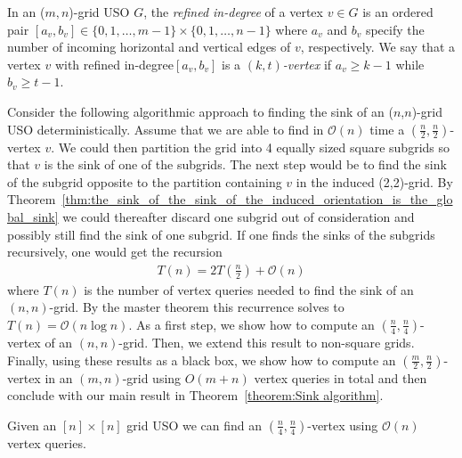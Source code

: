 \documentclass[runningheads,a4paper]{llncs}
\newcommand{\JN}[1]{\marginpar{\parbox{4cm}{{\small {\bf JN:} #1}}}} %
\newcommand{\indegree}{refined in-degree\xspace}
\begin{document}

In an ($m,n$)-grid USO $G$, the \emph{\indegree} of a vertex $v \in G$ is an ordered pair $[a_v, b_v] \in \{0,1,\ldots,m-1\}\times \{0,1,\ldots,n-1\}$ where $a_v$ and $b_v$ specify the number of incoming horizontal  and vertical edges of $v$, respectively.
We say that a vertex $v$ with \indegree $[a_v, b_v]$ is a \emph{$(k, t)$-vertex} if $a_v\geq k-1$ while $b_v\geq t-1$.

Consider the following algorithmic approach to finding the sink of an ($n$,$n$)-grid USO deterministically. 
Assume that we are able to find in $\mathcal{O}(n)$ time a $(\frac{n}{2}, \frac{n}{2})$-vertex $v$.
We could then partition the grid into 4 equally sized square subgrids so that $v$ is the sink of one of the subgrids.
The next step would be to find the sink of the subgrid opposite to the partition containing $v$ in the induced (2,2)-grid. 
By Theorem~\ref{thm:the_sink_of_the_sink_of_the_induced_orientation_is_the_global_sink} we could thereafter discard one subgrid out of consideration and possibly still find the sink of one subgrid.
If one finds the sinks of the subgrids recursively, one would get the recursion
\begin{align*}
 T(n) = 2T\left(\frac{n}{2}\right) + \mathcal{O}(n)
\end{align*}
where $T(n)$ is the number of vertex queries needed to find the sink of an $(n,n)$-grid. By the master theorem this recurrence solves to $T(n) = \mathcal{O}(n\log n)$. 
As a first step, we show how to compute an $(\frac{n}{4}, \frac{n}{4})$-vertex of an $(n, n)$-grid. Then, we extend this result to non-square grids. Finally, using these results as a black box, we show how to compute an $(\frac{m}{2}, \frac{n}{2})$-vertex in an $(m,n)$-grid using $O(m+n)$ vertex queries in total and then conclude with our main result in Theorem~\ref{theorem:Sink algorithm}. 

\begin{lemma}
\label{lem:seed_lemma_for_square_matrices}
 Given an $[n]\times [n]$ grid USO we can find an $(\frac{n}{4}, \frac{n}{4})$-vertex using $\mathcal{O}(n)$ vertex queries.
\end{lemma}
\end{document}
